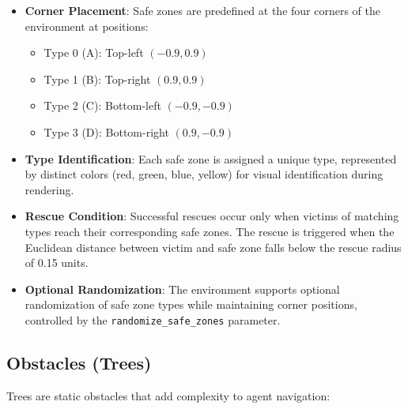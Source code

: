 \documentclass[11pt,a4paper]{article}
\begin{document}
\begin{itemize}
    \item \textbf{Corner Placement}: Safe zones are predefined at the four corners of the environment at positions:
    \begin{itemize}
        \item Type 0 (A): Top-left $(-0.9, 0.9)$
        \item Type 1 (B): Top-right $(0.9, 0.9)$
        \item Type 2 (C): Bottom-left $(-0.9, -0.9)$
        \item Type 3 (D): Bottom-right $(0.9, -0.9)$
    \end{itemize}

    \item \textbf{Type Identification}: Each safe zone is assigned a unique type, represented by distinct colors (red, green, blue, yellow) for visual identification during rendering.

    \item \textbf{Rescue Condition}: Successful rescues occur only when victims of matching types reach their corresponding safe zones.
    The rescue is triggered when the Euclidean distance between victim and safe zone falls below the rescue radius of 0.15 units.

    \item \textbf{Optional Randomization}: The environment supports optional randomization of safe zone types while maintaining corner positions, controlled by the \texttt{randomize\_safe\_zones} parameter.
\end{itemize}

\subsection{Obstacles (Trees)}
\label{subsec:obstacles}

Trees are static obstacles that add complexity to agent navigation:
\end{document}
